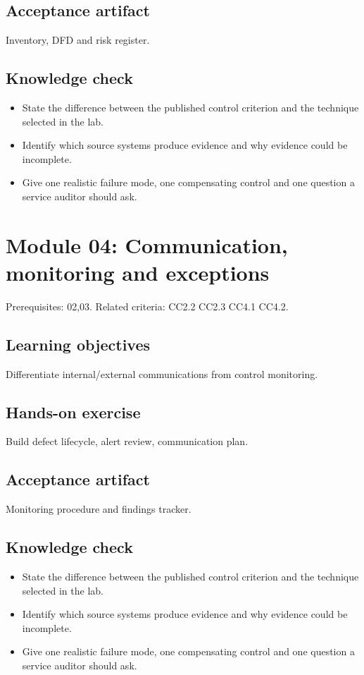 \documentclass[10pt,oneside]{report}
\begin{document}
\subsection{Acceptance artifact}
Inventory, DFD and risk register.

\subsection{Knowledge check}
\begin{itemize}
\item State the difference between the published control criterion and the technique selected in the lab.
\item Identify which source systems produce evidence and why evidence could be incomplete.
\item Give one realistic failure mode, one compensating control and one question a service auditor should ask.
\end{itemize}

\section{Module 04: Communication, monitoring and exceptions}
Prerequisites: 02,03. Related criteria: CC2.2 CC2.3 CC4.1 CC4.2.

\subsection{Learning objectives}
Differentiate internal/external communications from control monitoring.

\subsection{Hands-on exercise}
Build defect lifecycle, alert review, communication plan.

\subsection{Acceptance artifact}
Monitoring procedure and findings tracker.

\subsection{Knowledge check}
\begin{itemize}
\item State the difference between the published control criterion and the technique selected in the lab.
\item Identify which source systems produce evidence and why evidence could be incomplete.
\item Give one realistic failure mode, one compensating control and one question a service auditor should ask.
\end{itemize}
\end{document}
